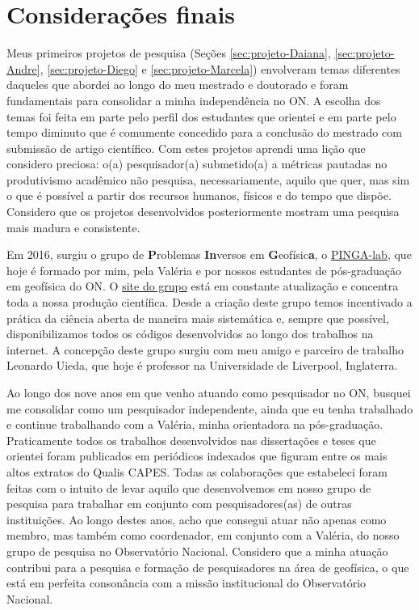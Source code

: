 \renewcommand{\chaptername}{Capítulo}
\chapter{Considerações finais}
\renewcommand{\chaptername}{Considerações finais}
\label{cap:consideracoes-finais}

Meus primeiros projetos de pesquisa (Seções \ref{sec:projeto-Daiana},
\ref{sec:projeto-Andre}, \ref{sec:projeto-Diego} e \ref{sec:projeto-Marcela}) envolveram 
temas diferentes daqueles que abordei ao longo do meu mestrado e doutorado e
foram fundamentais para consolidar a minha independência no ON.
A escolha dos temas foi feita em parte pelo perfil dos 
estudantes que orientei e em parte pelo tempo diminuto que é comumente concedido 
para a conclusão do mestrado com submissão de artigo científico. 
Com estes projetos aprendi uma lição que considero preciosa: o(a) pesquisador(a) 
submetido(a) a métricas pautadas no produtivismo acadêmico não pesquisa, necessariamente, 
aquilo que quer, mas sim o que é possível a partir dos recursos humanos, físicos e do
tempo que dispõe. Considero que os projetos desenvolvidos posteriormente mostram
uma pesquisa mais madura e consistente.

Em 2016, surgiu o grupo de \textbf{P}roblemas \textbf{In}versos 
em \textbf{G}eofísic\textbf{a}, o \href{https://www.pinga-lab.org/}{PINGA-lab}, 
que hoje é formado por mim, pela Valéria e por nossos estudantes de 
pós-graduação em geofísica do ON. O \href{https://www.pinga-lab.org/}{site do grupo} 
está em constante atualização e concentra toda a nossa produção científica. 
Desde a criação deste grupo temos incentivado a prática da ciência aberta de maneira 
mais sistemática e, sempre que possível, disponibilizamos todos os códigos desenvolvidos 
ao longo dos trabalhos na internet. A concepção deste grupo surgiu com meu amigo e 
parceiro de trabalho Leonardo Uieda, que hoje é professor na Universidade de Liverpool,
Inglaterra.

Ao longo dos nove anos em que venho atuando como pesquisador no ON, 
busquei me consolidar como um pesquisador independente, ainda que eu tenha trabalhado
e continue trabalhando com a Valéria, minha orientadora na pós-graduação.
Praticamente todos os trabalhos desenvolvidos nas dissertações e teses que 
orientei foram publicados em periódicos indexados que figuram entre 
os mais altos extratos do Qualis CAPES.
Todas as colaborações que estabeleci foram feitas com o intuito de levar aquilo que 
desenvolvemos em nosso grupo de pesquisa para trabalhar em conjunto com 
pesquisadores(as) de outras instituições. 
Ao longo destes anos, acho que consegui atuar não apenas como membro, mas também 
como coordenador, em conjunto com a Valéria, do nosso grupo de pesquisa 
no Observatório Nacional.
Considero que a minha atuação contribui para a pesquisa e formação de pesquisadores na 
área de geofísica, o que está em perfeita consonância com a missão institucional do
Observatório Nacional. 

